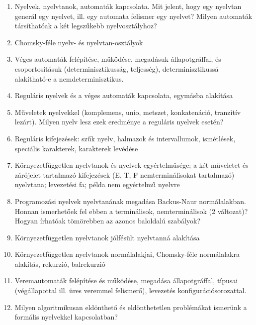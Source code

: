 \documentclass[a4paper]{article}
\begin{document}
\begin{enumerate}
    \Large
    \item Nyelvek, nyelvtanok, automaták kapcsolata. Mit jelent, hogy
	egy nyelvtan generál egy nyelvet, ill. egy automata felismer egy
	nyelvet? Milyen automaták társíthatóak a két legszűkebb
	nyelvosztályhoz?
    \item Chomsky-féle nyelv- és nyelvtan-osztályok
    \item Véges automaták felépítése, működése, megadásuk
        állapotgráffal, és csoportosításuk (determinisztikusság,
        teljesség), determinisztikussá alakítható-e a
	nemdeterminisztikus.
    \item Reguláris nyelvek és a véges automaták kapcsolata, egymásba
        alakítása
    \item Műveletek nyelvekkel (komplemens, unio, metszet, konkatenáció,
        tranzitív lezárt). Milyen nyelv lesz ezek eredménye a reguláris
        nyelvek esetén?
    \item Reguláris kifejezések: szűk nyelv, halmazok és intervallumok,
	ismétlések, speciális karakterek, karakterek levédése
    \item Környezetfüggetlen nyelvtanok és nyelvek egyértelműsége; a két
        műveletet és zárójelet tartalmazó kifejezések (E, T, F
        nemterminálisokat tartalmazó) nyelvtana; levezetési fa; példa
        nem egyértelmű nyelvre
    \item Programozási nyelvek nyelvtanának megadása Backus-Naur
	normálalakban. Honnan ismerhetőek fel ebben a terminálisok,
	nemterminálisok (2 változat)? Hogyan írhatóak tömörebben az
	azonos baloldalú szabályok?
    \item Környezetfüggetlen nyelvtanok jólfésült nyelvtanná alakítása
    \item Környezetfüggetlen nyelvtanok normálalakjai, Chomsky-féle
        normálalakra alakítás, rekurzió, balrekurzió
    \item Veremautomaták felépítése és működése, megadása
        állapotgráffal, típusai (végállapottal ill. üres veremmel
        felismerő), levezetés konfigurációsorozattal.
% 
% 
% 
    \item Milyen algoritmikusan eldönthető és eldönthetetlen problémákat
        ismerünk a formális nyelvekkel kapcsolatban?
\end{enumerate}
\end{document}
